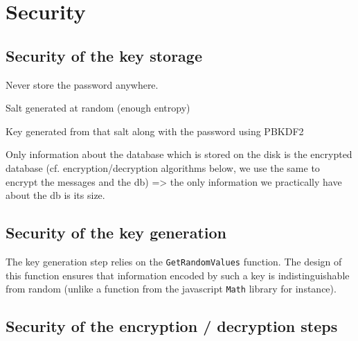 \documentclass[10pt,twocolumn]{article}
\begin{document}
\section{Security}
\label{sec:security}

\subsection{Security of the key storage}

Never store the password anywhere.

Salt generated at random (enough entropy)

Key generated from that salt along with the password using PBKDF2

Only information about the database which is stored on the disk is the encrypted database (cf. encryption/decryption algorithms below, we use the same to encrypt the messages and the db) => the only information we practically have about the db is its size.




\subsection{Security of the key generation}

The key generation step relies on the \texttt{GetRandomValues} function. The design of this function ensures that information encoded by such a key is indistinguishable from random (unlike a function from the javascript \texttt{Math} library for instance).





\subsection{Security of the encryption / decryption steps}
\end{document}
